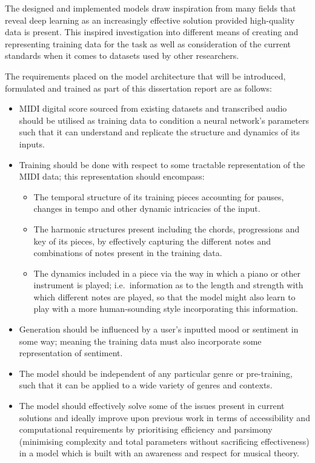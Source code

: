 \documentclass[12pt,]{article}
\providecommand{\tightlist}{%
  \setlength{\itemsep}{0pt}\setlength{\parskip}{0pt}}
\begin{document}
The designed and implemented models draw inspiration from many fields
that reveal deep learning as an increasingly effective solution provided
high-quality data is present. This inspired investigation into different
means of creating and representing training data for the task as well as
consideration of the current standards when it comes to datasets used by
other researchers.

The requirements placed on the model architecture that will be
introduced, formulated and trained as part of this dissertation report
are as follows:

\begin{itemize}
\tightlist
\item
  MIDI digital score sourced from existing datasets and transcribed
  audio should be utilised as training data to condition a neural
  network's parameters such that it can understand and replicate the
  structure and dynamics of its inputs.
\item
  Training should be done with respect to some tractable representation
  of the MIDI data; this representation should encompass:

  \begin{itemize}
  \tightlist
  \item
    The temporal structure of its training pieces accounting for pauses,
    changes in tempo and other dynamic intricacies of the input.
  \item
    The harmonic structures present including the chords, progressions
    and key of its pieces, by effectively capturing the different notes
    and combinations of notes present in the training data.
  \item
    The dynamics included in a piece via the way in which a piano or
    other instrument is played; i.e.~information as to the length and
    strength with which different notes are played, so that the model
    might also learn to play with a more human-sounding style
    incorporating this information.
  \end{itemize}
\item
  Generation should be influenced by a user's inputted mood or sentiment
  in some way; meaning the training data must also incorporate some
  representation of sentiment.
\item
  The model should be independent of any particular genre or
  pre-training, such that it can be applied to a wide variety of genres
  and contexts.
\item
  The model should effectively solve some of the issues present in
  current solutions and ideally improve upon previous work in terms of
  accessibility and computational requirements by prioritising
  efficiency and parsimony (minimising complexity and total parameters
  without sacrificing effectiveness) in a model which is built with an
  awareness and respect for musical theory.
\end{itemize}
\end{document}
